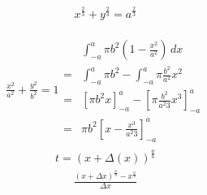 \documentclass{article}
\begin{document}
\begin{gather*}
  x^{\frac{2}{3}} + y^{\frac{2}{3}} = a^{\frac{2}{3}}
\end{gather*}

\begin{gather*}
  \frac{x^{2}}{a^{2}} + \frac{y^{2}}{b^{2}} = 1
  \begin{align*}
  &\int_{-a}^{a} \pi b^{2}\left(1 - \frac{x^{2}}{a^{2}} \right) \,dx \\
  =&\int_{-a}^{a}\pi b^{2} -  \int_{-a}^{a}\pi \frac{b^{2}}{a^{2}}x^{2} \\
  =&\left[\pi b^{2} x\right]_{-a}^{a} -  \left[\pi \frac{b^{2}}{a^{2}3} x^{3} \right]_{-a}^{a} \\
  =&\pi b^{2} \left[ x - \frac{x^{3}}{a^{2}3} \right]_{-a}^{a}
  \end{align*}
\end{gather*}
\begin{align*}
  t = \left( x + \Delta(x) \right)^{\frac{a}{b}}
\end{align*}
\begin{align*}
  \frac{\left( x + \Delta{x} \right)^{\frac{a}{b}} - x^{\frac{a}{b}}}{\Delta{x}}
\end{align*}
\end{document}
